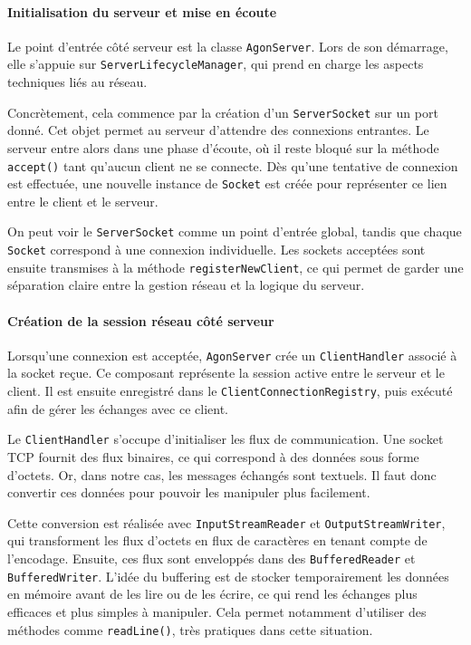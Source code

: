 \documentclass[a4paper]{article}
\begin{document}
\paragraph{Initialisation du serveur et mise en écoute}

Le point d’entrée côté serveur est la classe \texttt{AgonServer}. Lors de son démarrage, elle s’appuie sur \texttt{ServerLifecycleManager}, qui prend en charge les aspects techniques liés au réseau.

Concrètement, cela commence par la création d’un \texttt{ServerSocket} sur un port donné. Cet objet permet au serveur d’attendre des connexions entrantes. Le serveur entre alors dans une phase d’écoute, où il reste bloqué sur la méthode \texttt{accept()} tant qu’aucun client ne se connecte. Dès qu’une tentative de connexion est effectuée, une nouvelle instance de \texttt{Socket} est créée pour représenter ce lien entre le client et le serveur.

On peut voir le \texttt{ServerSocket} comme un point d’entrée global, tandis que chaque \texttt{Socket} correspond à une connexion individuelle. Les sockets acceptées sont ensuite transmises à la méthode \texttt{registerNewClient}, ce qui permet de garder une séparation claire entre la gestion réseau et la logique du serveur.

\paragraph{Création de la session réseau côté serveur}

Lorsqu’une connexion est acceptée, \texttt{AgonServer} crée un \texttt{ClientHandler} associé à la socket reçue. Ce composant représente la session active entre le serveur et le client. Il est ensuite enregistré dans le \texttt{ClientConnectionRegistry}, puis exécuté afin de gérer les échanges avec ce client.

Le \texttt{ClientHandler} s’occupe d’initialiser les flux de communication. Une socket TCP fournit des flux binaires, ce qui correspond à des données sous forme d’octets. Or, dans notre cas, les messages échangés sont textuels. Il faut donc convertir ces données pour pouvoir les manipuler plus facilement.

Cette conversion est réalisée avec \texttt{InputStreamReader} et \texttt{OutputStreamWriter}, qui transforment les flux d’octets en flux de caractères en tenant compte de l’encodage. Ensuite, ces flux sont enveloppés dans des \texttt{BufferedReader} et \texttt{BufferedWriter}. L’idée du buffering est de stocker temporairement les données en mémoire avant de les lire ou de les écrire, ce qui rend les échanges plus efficaces et plus simples à manipuler. Cela permet notamment d’utiliser des méthodes comme \texttt{readLine()}, très pratiques dans cette situation.
\end{document}

